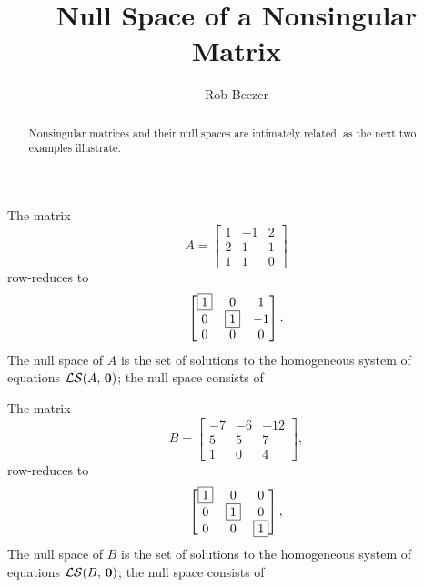 \documentclass{ximera}
\author{Rob Beezer}
\title{Null Space of a Nonsingular Matrix}
\begin{document}
\begin{abstract}
  Nonsingular matrices and their null spaces are intimately related,
  as the next two examples illustrate.
\end{abstract}
\maketitle

\begin{example}
  The  matrix
  \[
    A = \begin{bmatrix}
      1 & -1 & 2 \\
      2 & 1 & 1 \\
      1 & 1 & 0 
    \end{bmatrix}
  \]
  row-reduces to
  \[
    \begin{bmatrix}
      \fbox{1} & 0 & 1 \\
      0 & \fbox{1} & -1 \\
      0 & 0 & 0 
    \end{bmatrix}.
  \]
  The null space of $A$ is the set of solutions to the homogeneous
  system of equations $\mathcal{LS}\!\left(A,\,\mathbf{0}\right)$; the null space consists of 
  \begin{multipleChoice}
  \end{multipleChoice}
\end{example}

\begin{example}
  The  matrix
  \[
    B = \begin{bmatrix}
      -7&-6&- 12\\
      5&5&7 \\
      1&0&4
    \end{bmatrix},
  \]
  row-reduces to
  \[
    \begin{bmatrix}
      \fbox{1}&0&0 \\
      0&\fbox{1}&0 \\
      0&0&\fbox{1}
    \end{bmatrix},
  \]
  The null space of $B$ is the set of solutions to the homogeneous
  system of equations $\mathcal{LS}\!\left(B,\,\mathbf{0}\right)$; the null space consists of 
  \begin{multipleChoice}
  \end{multipleChoice}
\end{example}
\end{document}

